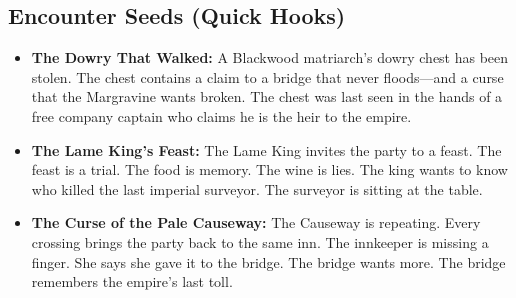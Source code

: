 \subsection*{Encounter Seeds (Quick Hooks)}
\begin{itemize}
\item \textbf{The Dowry That Walked:} A Blackwood matriarch's dowry chest has been stolen. The chest contains a claim to a bridge that never floods---and a curse that the Margravine wants broken. The chest was last seen in the hands of a free company captain who claims he is the heir to the empire.
\item \textbf{The Lame King's Feast:} The Lame King invites the party to a feast. The feast is a trial. The food is memory. The wine is lies. The king wants to know who killed the last imperial surveyor. The surveyor is sitting at the table.
\item \textbf{The Curse of the Pale Causeway:} The Causeway is repeating. Every crossing brings the party back to the same inn. The innkeeper is missing a finger. She says she gave it to the bridge. The bridge wants more. The bridge remembers the empire's last toll.
\end{itemize}

